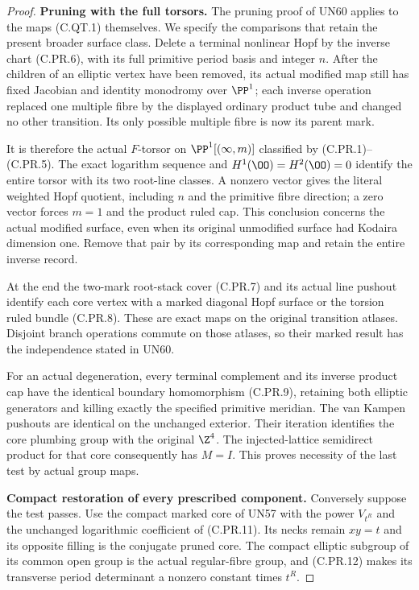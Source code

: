 \begin{proof}
\par\medskip\noindent\textbf{Pruning with the full torsors.}
The pruning proof of UN60 applies to the
maps (C.QT.1) themselves. We specify the
comparisons that retain the present
broader surface class. Delete a terminal
nonlinear Hopf by the inverse chart
(C.PR.6), with its full primitive period
basis and integer $n$. After the children
of an elliptic vertex have been removed,
its actual modified map still has fixed
Jacobian and identity monodromy over
$\PP^1$; each inverse operation replaced
one multiple fibre by the displayed
ordinary product tube and changed no
other transition. Its only possible
multiple fibre is now its parent mark.

It is therefore the actual $F$-torsor
on $\PP^1[(\infty,m)]$ classified by
(C.PR.1)--(C.PR.5). The exact logarithm
sequence and $H^1(\OO)=H^2(\OO)=0$
identify the entire torsor with its
two root-line classes. A nonzero
vector gives the literal weighted
Hopf quotient, including $n$ and
the primitive fibre direction;
a zero vector forces $m=1$ and
the product ruled cap. This conclusion
concerns the actual modified surface,
even when its original unmodified
surface had Kodaira dimension one.
Remove that pair by its corresponding
map and retain the entire inverse
record.

At the end the two-mark root-stack
cover (C.PR.7) and its actual line
pushout identify each core vertex
with a marked diagonal Hopf surface
or the torsion ruled bundle (C.PR.8).
These are exact maps on the original
transition atlases. Disjoint branch
operations commute on those atlases,
so their marked result has the
independence stated in UN60.

For an actual degeneration, every
terminal complement and its inverse
product cap have the identical
boundary homomorphism (C.PR.9),
retaining both elliptic generators
and killing exactly the specified
primitive meridian. The van Kampen
pushouts are identical on the
unchanged exterior. Their iteration
identifies the core plumbing group
with the original $\Z^4$. The
injected-lattice semidirect product
for that core consequently has
$M=I$. This proves necessity of
the last test by actual group maps.

\par\medskip\noindent\textbf{Compact restoration of every prescribed component.}
Conversely suppose the test passes.
Use the compact marked core of UN57
with the power $V_{t^R}$ and the
unchanged logarithmic coefficient
of (C.PR.11). Its necks remain
$xy=t$ and its opposite filling
is the conjugate pruned core.
The compact elliptic subgroup of
its common open group is the
actual regular-fibre group, and
(C.PR.12) makes its transverse
period determinant a nonzero
constant times $t^R$.


\end{proof}
